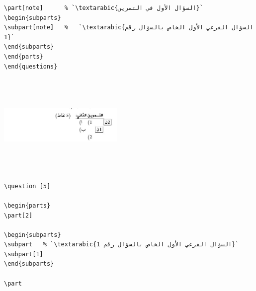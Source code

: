 \documentclass[11pt,A4]{article}
\begin{document}
\begin{enumerate}
\begin{enumerate}[label=\alph*)]
\begin{tcolorbox}[colback=white]
\begin{english}
\begin{lstlisting}
\part[note]      % `\textarabic{السؤال الأول في التمرين}`
\begin{subparts}
\subpart[note]   %   `\textarabic{السؤال الفرعي الأول الخاص بالسؤال رقم 1}` 
\end{subparts}
\end{parts}
\end{questions}
\end{lstlisting}
\end{english}
\end{tcolorbox}
\end{enumerate} 
 \begin{tcolorbox}[attach boxed title to top right=
{yshift=-\tcboxedtitleheight/3,xshift=-5mm},title=\textarabic{\sffamily مثال},colbacktitle=BrickRed,sidebyside]
\includegraphics[width=6cm,height=5cm]{4.JPG} 
\tcblower

\begin{english}
\begin{lstlisting}
\question [5]

\begin{parts}
\part[2] 

\begin{subparts}
\subpart   % `\textarabic{السؤال الفرعي الأول الخاص بالسؤال رقم 1}` 
\subpart[1]
\end{subparts}

\part 


\end{lstlisting}
\end{english}
\end{tcolorbox}
\end{enumerate}
\end{document}
